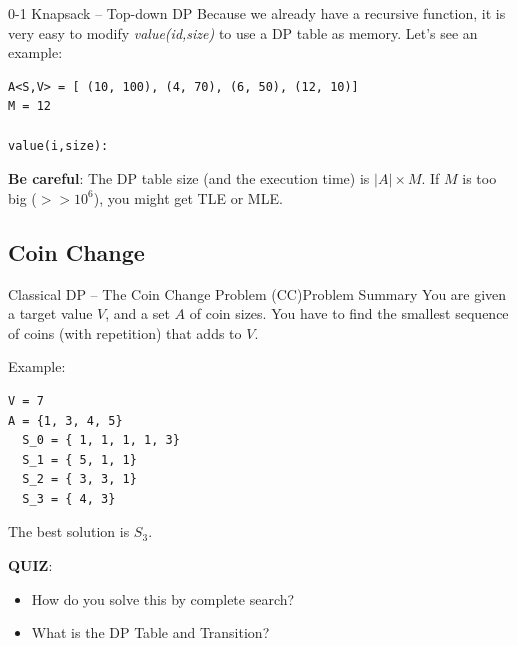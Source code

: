 \begin{frame}[fragile]{0-1 Knapsack -- Top-down DP}
  Because we already have a recursive function, it is very easy to modify \emph{value(id,size)} to use a DP table as memory. Let's see an example:

\begin{verbatim}
A<S,V> = [ (10, 100), (4, 70), (6, 50), (12, 10)]
M = 12

value(i,size):
\end{verbatim}

  \begin{center}
  \bigskip
  \end{center}

  {\bf Be careful}: The DP table size (and the execution time) is $|A|\times M$. If $M$ is too big ($>> 10^6$), you might get TLE or MLE.
\end{frame}

\subsection{Coin Change}
\begin{frame}[fragile]{Classical DP -- The Coin Change Problem (CC)}{Problem Summary}
  You are given a target value $V$, and a set $A$ of coin sizes. You have to find the smallest sequence of coins (with repetition) that adds to $V$.
  \bigskip

Example:
\begin{verbatim}
V = 7
A = {1, 3, 4, 5}
  S_0 = { 1, 1, 1, 1, 3}
  S_1 = { 5, 1, 1}
  S_2 = { 3, 3, 1}
  S_3 = { 4, 3}
\end{verbatim}

The best solution is $S_3$.\bigskip

{\bf QUIZ}:
\begin{itemize}
  \item How do you solve this by complete search?
  \item What is the DP Table and Transition?
\end{itemize}
\end{frame}

